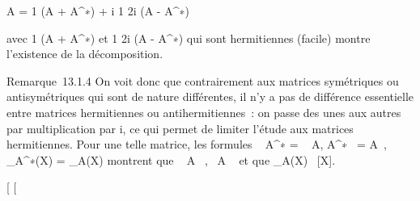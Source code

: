 \documentclass[]{article}
\begin{document}
A = 1  (A + A^∗) + i 1
\over 2i (A - A^∗)

avec  1  (A + A^∗) et  1
\over 2i (A - A^∗) qui sont hermitiennes
(facile) montre l'existence de la décomposition.

Remarque~13.1.4 On voit donc que contrairement aux matrices symétriques
ou antisymétriques qui sont de nature différentes, il n'y a pas de
différence essentielle entre matrices hermitiennes ou antihermitiennes~:
on passe des unes aux autres par multiplication par i, ce qui permet de
limiter l'étude aux matrices hermitiennes. Pour une telle matrice, les
formules ~
A^∗ =
\overline{}~
A,
A^∗~ =
\overline{}A~,
\chi\_A^∗(X) =
\overline\chi\_A(X) montrent que
~ A \in {}~,
~A \in {}~ et que
\chi\_A(X) \in {}~{[}X{]}.

{[}
{[}
\end{document}
